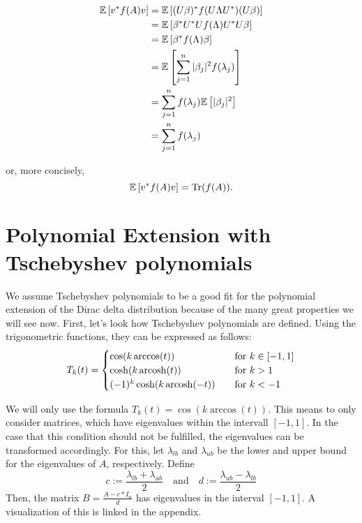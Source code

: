 \begin{align*}
    \mathbb{E}\left[v^* f(A) v\right] &= \mathbb{E}\left[(U\beta)^* f(U\Lambda U^*) (U\beta)\right] \\
        &= \mathbb{E}\left[\beta^* U^* U f(\Lambda) U^* U \beta\right] \\
        &= \mathbb{E}\left[\beta^* f(\Lambda) \beta\right] \\
        &= \mathbb{E}\left[\sum_{j = 1}^n |\beta_j|^2 f(\lambda_j) \right] \\
        &= \sum_{j = 1}^n f(\lambda_j) \mathbb{E}\left[ |\beta_j|^2 \right] \\
        &= \sum_{j = 1}^n f(\lambda_j)
\end{align*}

or, more concisely,
\begin{equation} \label{eq:theorem_result}
    \mathbb{E}\left[v^* f(A) v\right] = \operatorname{Tr}(f(A)).
\end{equation}

\section{Polynomial Extension with Tschebyshev polynomials}
We assume Tschebyshev polynomials to be a good fit for the polynomial extension of the Dirac delta distribution
because of the many great properties we will see now. First, let's look how Tschebyshev polynomials are defined.
Using the trigonometric functions, they can be expressed as follows:
\[ T_k(t) =
\begin{cases}
    \cos(k \arccos(t))            & \quad \text{for } k \in [-1, 1]\\
    \cosh(k \operatorname{arcosh}(t))           & \quad \text{for } k > 1\\
    (-1)^k \cosh(k \operatorname{arcosh}(-t))   & \quad \text{for } k < -1
\end{cases}
\]

We will only use the formula $T_k(t) = \cos(k \arccos(t))$.
This means to only consider matrices, which have eigenvalues within the intervall $[-1, 1]$.
In the case that this condition should not be fulfilled, the eigenvalues can be transformed accordingly.
For this, let $\lambda_{lb}$ and $\lambda_{ub}$ be the lower and upper bound for the eigenvalues of $A$, respectively.
Define
\[
c := \frac{\lambda_{lb} + \lambda_{ub}}{2} \quad \text{and} \quad d := \frac{\lambda_{ub} - \lambda_{lb}}{2}
\]
Then, the matrix $B = \frac{A - c*I_n}{d}$ has eigenvalues in the interval $[-1, 1]$.
A visualization of this is linked in the appendix.


